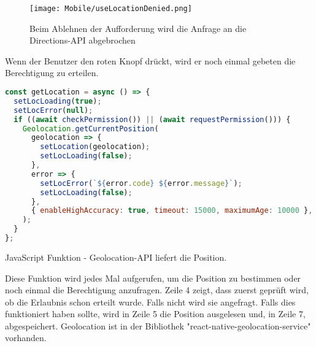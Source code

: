 \begin{figure}[H]
  \begin{center}
    \texttt{[image: Mobile/useLocationDenied.png]}
    \caption{Beim Ablehnen der Aufforderung wird die Anfrage an die Directions-API abgebrochen}
  \end{center}
\end{figure}

Wenn der Benutzer den roten Knopf drückt, wird er noch einmal gebeten die Berechtigung zu erteilen.

\newpage

\begin{code}[htp]
\begin{lstlisting}[firstnumber=1,language=JavaScript, style=JSX]
const getLocation = async () => {
  setLocLoading(true);
  setLocError(null);
  if ((await checkPermission()) || (await requestPermission())) {
    Geolocation.getCurrentPosition(
      geolocation => {
        setLocation(geolocation);
        setLocLoading(false);
      },
      error => {
        setLocError(`${error.code} ${error.message}`);
        setLocLoading(false);
      },
      { enableHighAccuracy: true, timeout: 15000, maximumAge: 10000 },
    );
  }
};
\end{lstlisting}
\caption{JavaScript Funktion - Geolocation-API liefert die Position.}
\end{code}

Diese Funktion wird jedes Mal aufgerufen, um die Position zu bestimmen oder noch einmal die
Berechtigung anzufragen. Zeile 4 zeigt, dass zuerst geprüft wird, ob die Erlaubnis schon erteilt
wurde. Falls nicht wird sie angefragt. Falls dies funktioniert haben sollte, wird in Zeile 5 die
Position ausgelesen und, in Zeile 7, abgespeichert. Geolocation ist in der Bibliothek
"react-native-geolocation-service" vorhanden.